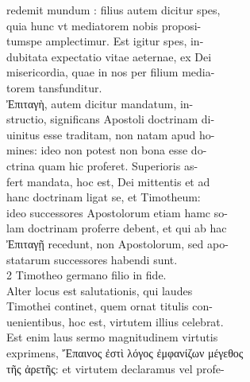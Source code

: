 \documentclass{article}
\begin{document}
\begin{pages}
                redemit mundum : filius autem dicitur spes, \\
                quia hunc vt mediatorem nobis proposi- \\
                tumspe amplectimur. Est igitur spes, in- \\
                dubitata expectatio vitae aeternae, ex Dei \\
                misericordia, quae in nos per filium media- \\
                torem tansfunditur. \\
                Ἐπιταγὴ, autem dicitur mandatum, in- \\
                structio, significans Apostoli doctrinam di- \\
                uinitus esse traditam, non natam apud ho- \\
                mines: ideo non potest non bona esse do- \\
                ctrina quam hic proferet. Superioris as- \\
                fert mandata, hoc est, Dei mittentis et ad \\
                hanc doctrinam ligat se, et Timotheum: \\
                ideo successores Apostolorum etiam hamc so- \\
                lam doctrinam proferre debent, et qui ab hac \\
                Ἐπιταγῇ  recedunt, non Apostolorum, sed apo- \\
                statarum successores habendi sunt. \\
                2 Timotheo germano filio in fide. \\
                Alter locus est salutationis, qui laudes \\
                Timothei continet, quem ornat titulis con- \\
                uenientibus, hoc est, virtutem illius celebrat. \\
                Est enim laus sermo magnitudinem virtutis \\
                exprimens, Ἔπαινος ἐστὶ λόγος ἐμφανίζων μέγεθος \\
                τῆς ἀρετῆς: et virtutem declaramus vel profe- \\

\end{pages}
\end{document}
